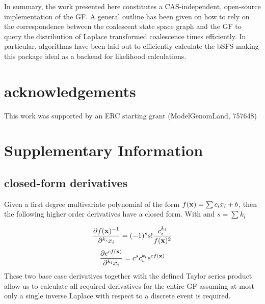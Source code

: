 \documentclass[10pt, a4]{article}
\newcommand{\beginsupplement}{%
        \setcounter{table}{0}
        \renewcommand{\thetable}{S\arabic{table}}%
        \setcounter{figure}{0}
        \renewcommand{\thefigure}{S\arabic{figure}}%
     }
\begin{document}
In summary, the work presented here constitutes a CAS-independent, open-source implementation of the GF. A general outline has been given on how to rely on the correspondence between the coalescent state space graph and the GF to query the distribution of Laplace transformed coalescence times efficiently. In particular, algorithms have been laid out to efficiently calculate the bSFS making this package ideal as a backend for likelihood calculations.

\section*{acknowledgements}
This work was supported by an ERC starting grant (ModelGenomLand, 757648)


\beginsupplement
\newpage
\section*{Supplementary Information}
\setcounter{equation}{0}
\setcounter{figure}{0}
\setcounter{table}{0}
\setcounter{page}{1}
\makeatletter
\renewcommand{\theequation}{S\arabic{equation}}
\renewcommand{\thefigure}{S\arabic{figure}}
\renewcommand{\bibnumfmt}[1]{[S#1]}
\renewcommand{\citenumfont}[1]{S#1}

\subsection*{closed-form derivatives}
Given a first degree multivariate polynomial of the form $f(\bold{x}) = \sum c_ix_i + b$, then the following higher order derivatives have a closed form. With and $s = \sum k_i$

\begin{equation} \label{eq:deriv_polynomial}
\frac{\partial f(\bold{x})^{-1}}{\partial^{k_i} x_i} = (-1)^s s! \frac{c^{k_i}_i}{f(\bold{x})^2}
\end{equation}
%
\begin{equation} \label{eq:deriv_exponential}
\frac{\partial e^{c f(\bold{x})}}{\partial^{k_i} x_i} = c^sc_i^{k_i}e^{cf(\bold{x})}	
\end{equation}
These two base case derivatives together with the defined Taylor series product allow us to calculate all required derivatives for the entire GF assuming at most only a single inverse Laplace with respect to a discrete event is required.
\end{document}
